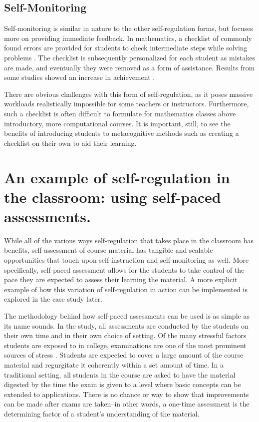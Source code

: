 \subsection{Self-Monitoring}
Self-monitoring is similar in nature to the other self-regulation forms, but focuses more on providing immediate feedback. In mathematics, a checklist of commonly found errors are provided for students to check intermediate steps while solving problems \citep{dunlap_self-monitoring_1989}. The checklist is subsequently personalized for each student as mistakes are made, and eventually they were removed as a form of assistance. Results from some studies showed an increase in achievement \citep{dunlap_self-monitoring_1989}.

There are obvious challenges with this form of self-regulation, as it  poses massive workloads realistically impossible for some teachers or instructors. Furthermore, such a checklist is often difficult to formulate for mathematics classes above introductory, more computational courses. It is important, still, to see the benefits of introducing students to metacognitive methods such as creating a checklist on their own to aid their learning.

\section{An example of self-regulation in the classroom: using self-paced assessments.}
While all of the various ways self-regulation that takes place in the classroom has benefits, self-assessment of course material has tangible and scalable opportunities that touch upon self-instruction and self-monitoring as well. More specifically, self-paced assessment allows for the students to take control of the pace they are expected to assess their learning the material. A more explicit example of how this variation of self-regulation in action can be implemented is explored in the case study later.

The methodology behind how self-paced assessments can be used is as simple as its name sounds. In the study, all assessments are conducted by the students on their own time and in their own choice of setting. Of the many stressful factors students are exposed to in college, examinations are one of the most prominent sources of stress \citep{abouserie_sources_1994}. Students are expected to cover a large amount of the course material and regurgitate it coherently within a set amount of time. In a traditional setting, all students in the course are asked to have the material digested by the time the exam is given to a level where basic concepts can be extended to applications. There is no chance or way to show that improvements can be made after exams are taken--in other words, a one-time assessment is the determining factor of a student's understanding of the material.

